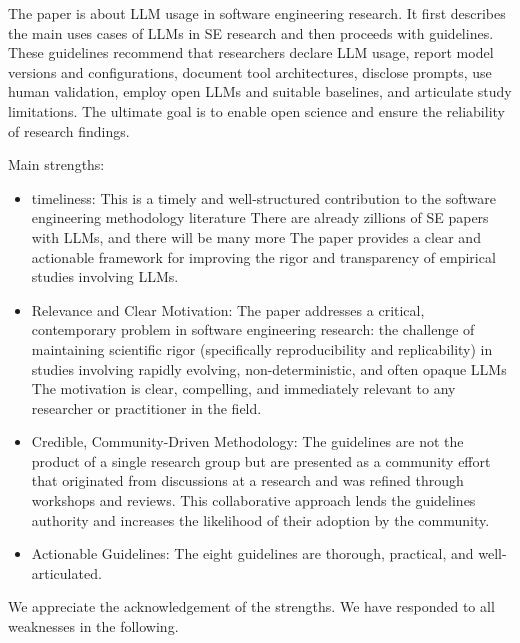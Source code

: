 \documentclass[12pt,english]{reviewresponse}
\begin{document}
\reviewer
\label{rev:2}
\begin{generalcomment}
The paper is about LLM usage in software engineering research. It first describes the main uses cases of LLMs in SE research and then proceeds with guidelines. These guidelines recommend that researchers declare LLM usage, report model versions and configurations, document tool architectures, disclose prompts, use human validation, employ open LLMs and suitable baselines, and articulate study limitations. The ultimate goal is to enable open science and ensure the reliability of research findings.

Main strengths:
\begin{itemize}
    \item timeliness: This is a timely and well-structured contribution to the software engineering methodology literature There are already zillions of SE papers with LLMs, and there will be many more The paper provides a clear and actionable framework for improving the rigor and transparency of empirical studies involving LLMs.
    \item Relevance and Clear Motivation: The paper addresses a critical, contemporary problem in software engineering research: the challenge of maintaining scientific rigor (specifically reproducibility and replicability) in studies involving rapidly evolving, non-deterministic, and often opaque LLMs The motivation is clear, compelling, and immediately relevant to any researcher or practitioner in the field.
    \item Credible, Community-Driven Methodology: The guidelines are not the product of a single research group but are presented as a community effort that originated from discussions at a research  and was refined through workshops and reviews. This collaborative approach lends the guidelines authority and increases the likelihood of their adoption by the community.
    \item Actionable Guidelines: The eight guidelines are thorough, practical, and well-articulated.
\end{itemize}
\end{generalcomment}
\begin{revresponse}
	We appreciate the acknowledgement of the strengths. We have responded to all weaknesses in the following.
\end{revresponse}
\end{document}

